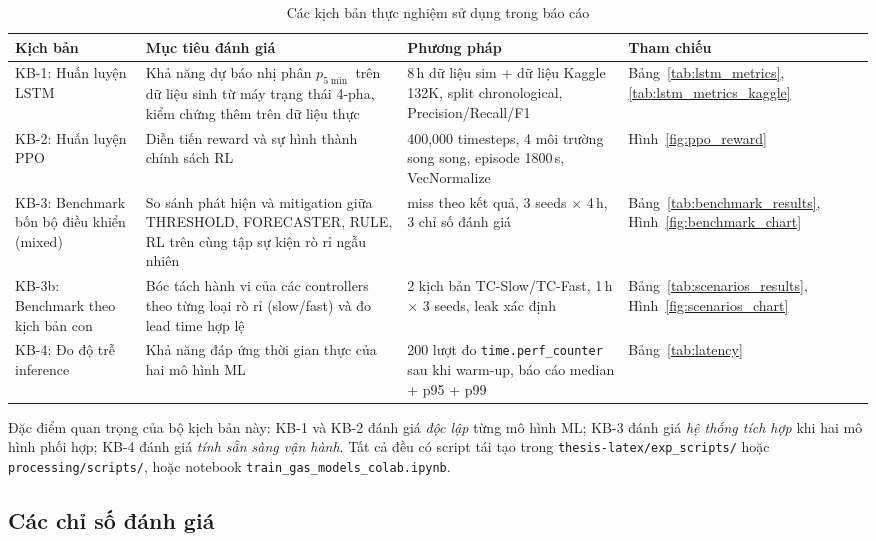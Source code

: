 \begin{table}[H]
\centering
\caption{Các kịch bản thực nghiệm sử dụng trong báo cáo}
\label{tab:scenarios}
\small
\setlength{\tabcolsep}{4pt}
\begin{tabular}{@{}p{2.6cm}p{3.7cm}p{4.2cm}p{3.2cm}@{}}
\toprule
\textbf{Kịch bản} & \textbf{Mục tiêu đánh giá} & \textbf{Phương pháp} & \textbf{Tham chiếu} \\
\midrule
KB-1: Huấn luyện LSTM & Khả năng dự báo nhị phân $p_{5\min}$ trên dữ liệu sinh từ máy trạng thái 4-pha, kiểm chứng thêm trên dữ liệu thực & 8\,h dữ liệu sim + dữ liệu Kaggle 132K, split chronological, Precision/Recall/F1 & Bảng~\ref{tab:lstm_metrics}, \ref{tab:lstm_metrics_kaggle} \\
\addlinespace
KB-2: Huấn luyện PPO & Diễn tiến reward và sự hình thành chính sách RL & 400{,}000 timesteps, 4 môi trường song song, episode 1800\,s, VecNormalize & Hình~\ref{fig:ppo_reward} \\
\addlinespace
KB-3: Benchmark bốn bộ điều khiển (mixed) & So sánh phát hiện và mitigation giữa THRESHOLD, FORECASTER, RULE, RL trên cùng tập sự kiện rò rỉ ngẫu nhiên & miss theo kết quả, 3 seeds $\times$ 4\,h, 3 chỉ số đánh giá & Bảng~\ref{tab:benchmark_results}, Hình~\ref{fig:benchmark_chart} \\
\addlinespace
KB-3b: Benchmark theo kịch bản con & Bóc tách hành vi của các controllers theo từng loại rò rỉ (slow/fast) và đo lead time hợp lệ & 2 kịch bản TC-Slow/TC-Fast, 1\,h $\times$ 3 seeds, leak xác định & Bảng~\ref{tab:scenarios_results}, Hình~\ref{fig:scenarios_chart} \\
\addlinespace
KB-4: Đo độ trễ inference & Khả năng đáp ứng thời gian thực của hai mô hình ML & 200 lượt đo \texttt{time.perf\_counter} sau khi warm-up, báo cáo median + p95 + p99 & Bảng~\ref{tab:latency} \\
\bottomrule
\end{tabular}
\end{table}

Đặc điểm quan trọng của bộ kịch bản này: KB-1 và KB-2 đánh giá \emph{độc lập} từng mô hình ML; KB-3 đánh giá \emph{hệ thống tích hợp} khi hai mô hình phối hợp; KB-4 đánh giá \emph{tính sẵn sàng vận hành}. Tất cả đều có script tái tạo trong \texttt{thesis-latex/exp\_scripts/} hoặc \texttt{processing/scripts/}, hoặc notebook \texttt{train\_gas\_models\_colab.ipynb}.

\subsection{Các chỉ số đánh giá}

